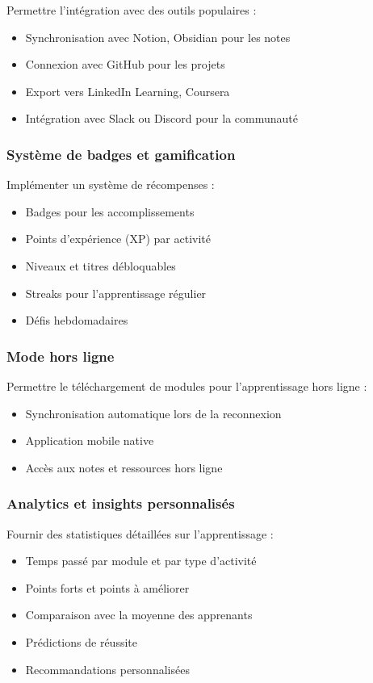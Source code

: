 \documentclass[12pt,a4paper]{article}
\begin{document}
Permettre l'intégration avec des outils populaires :
\begin{itemize}
    \item Synchronisation avec Notion, Obsidian pour les notes
    \item Connexion avec GitHub pour les projets
    \item Export vers LinkedIn Learning, Coursera
    \item Intégration avec Slack ou Discord pour la communauté
\end{itemize}

\subsubsection{Système de badges et gamification}

Implémenter un système de récompenses :
\begin{itemize}
    \item Badges pour les accomplissements
    \item Points d'expérience (XP) par activité
    \item Niveaux et titres débloquables
    \item Streaks pour l'apprentissage régulier
    \item Défis hebdomadaires
\end{itemize}

\subsubsection{Mode hors ligne}

Permettre le téléchargement de modules pour l'apprentissage hors ligne :
\begin{itemize}
    \item Synchronisation automatique lors de la reconnexion
    \item Application mobile native
    \item Accès aux notes et ressources hors ligne
\end{itemize}

\subsubsection{Analytics et insights personnalisés}

Fournir des statistiques détaillées sur l'apprentissage :
\begin{itemize}
    \item Temps passé par module et par type d'activité
    \item Points forts et points à améliorer
    \item Comparaison avec la moyenne des apprenants
    \item Prédictions de réussite
    \item Recommandations personnalisées
\end{itemize}
\end{document}
